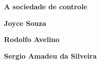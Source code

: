 \textbf{A sociedade de controle} \lipsum[1]

\textbf{Joyce Souza} \lipsum[2]

\textbf{Rodolfo Avelino} \lipsum[3]

\textbf{Sergio Amadeu da Silveira} \lipsum[4]

